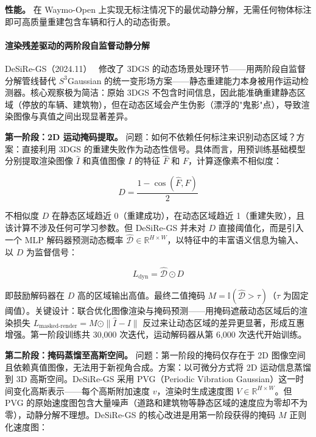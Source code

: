 \textbf{性能。} 在 Waymo-Open 上实现无标注情况下的最优动静分解，无需任何物体标注即可高质量重建包含车辆和行人的动态街景。

\paragraph{渲染残差驱动的两阶段自监督动静分解}

DeSiRe-GS（2024.11）~\cite{2411_11921} 修改了 3DGS 的动态场景处理环节——用两阶段自监督分解管线替代 $S^3$Gaussian 的统一变形场方案——静态重建能力本身被用作运动检测器。核心观察极为简洁：原始 3DGS 不包含时间信息，因此能准确重建静态区域（停放的车辆、建筑物），但在动态区域会产生伪影（漂浮的"鬼影"点），导致渲染图像与真值之间出现显著差异。

\textbf{第一阶段：2D 运动掩码提取。} 问题：如何不依赖任何标注来识别动态区域？方案：直接利用 3DGS 的重建失败作为动态性信号。具体而言，用预训练基础模型分别提取渲染图像 $\hat{I}$ 和真值图像 $I$ 的特征 $\hat{F}$ 和 $F$，计算逐像素不相似度：

\begin{equation}
D = \frac{1 - \cos(\hat{F}, F)}{2}
\end{equation}

不相似度 $D$ 在静态区域趋近 0（重建成功），在动态区域趋近 1（重建失败），且该计算不涉及任何可学习参数。但 DeSiRe-GS 并未对 $D$ 直接阈值化，而是引入一个 MLP 解码器预测动态概率 $\hat{\mathcal{D}} \in \mathbb{R}^{H \times W}$，以特征中的丰富语义信息为输入、以 $D$ 为监督信号：

\begin{equation}
L_{\text{dyn}} = \hat{\mathcal{D}} \odot D
\end{equation}

即鼓励解码器在 $D$ 高的区域输出高值。最终二值掩码 $M = \mathbb{I}(\hat{\mathcal{D}} > \tau)$（$\tau$ 为固定阈值）。关键设计：联合优化图像渲染与掩码预测——用掩码遮蔽动态区域后的渲染损失 $L_{\text{masked-render}} = M \odot \|\hat{I} - I\|$ 反过来让动态区域的差异更显著，形成互惠增强。第一阶段训练共 30,000 次迭代，运动解码器从第 6,000 次迭代开始训练。

\textbf{第二阶段：掩码蒸馏至高斯空间。} 问题：第一阶段的掩码仅存在于 2D 图像空间且依赖真值图像，无法用于新视角合成。方案：以可微分方式将 2D 运动信息蒸馏到 3D 高斯空间。DeSiRe-GS 采用 PVG（Periodic Vibration Gaussian）这一时间变化高斯表示——每个高斯附加速度 $v$，渲染时生成速度图 $V \in \mathbb{R}^{H \times W}$。但 PVG 的原始速度图包含大量噪声（道路和建筑物等静态区域的速度应为零却不为零），动静分解不理想。DeSiRe-GS 的核心改进是用第一阶段获得的掩码 $M$ 正则化速度图：

